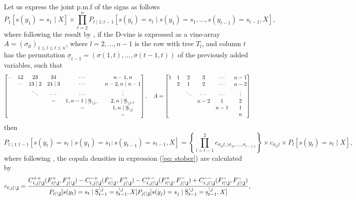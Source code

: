 \documentclass[harvard,11pt]{article}
\begin{document}
Let us express the joint p.m.f of the signs as follows
\begin{equation}
P_1[s(y_1)=s_1\mid X]\times\prod\limits_{t=2}^{n}P_{t\mid 1:{t-1}}[s(y_t)=s_t\mid s(y_1)=s_1,...,s(y_{t-1})=s_{t-1},X],
\end{equation}
where following the result by \citet{stoeber2013simplified}, if the D-vine is expressed as a vine-array $A=(\sigma_{lt})_{1\leq l\leq t\leq n}$, where $l=2,...,n-1$ is the row with tree $T_l$, and column $t$ has the permutation $\underline{\sigma}_{t-1}=(\sigma(1,t),...,\sigma(t-1,t))$ of the previously added variables, such that
\begin{equation*}
\begin{bmatrix}
- & 12 & 23 &34 &\cdots & n-1,n\\
 &-&13\mid2&24\mid 3&\cdots&n-2,n\mid n-1\\
& & \ddots&\cdots&\cdots&\vdots\\
&&&-&1,n-1\mid \text{\b{S}}_{\backslash j-}&2,n \mid \text{\b{S}}_{\backslash j+}\\
&&&&-&1,n\mid \text{\b{S}}_{\backslash j}\\
&&&&&-
\end{bmatrix},\quad
A=
\begin{bmatrix}
1 & 1 & 2 &3 &\cdots & n-1\\
 &2&1&2&\cdots&n-2\\
& & \ddots&\cdots&\cdots&\vdots\\
&&&n-2&1&2\\
&&&&n-1&1\\
&&&&&n
\end{bmatrix}
\end{equation*}
then 
\begin{equation}\label{eq: stober}
P_{t\mid 1:{t-1}}[s(y_t)=s_t\mid s(y_1)=s_1:s(y_{t-1})=s_{t-1}, X]=\left\{\prod\limits_{l=t-1}^{2} c_{\sigma_{lt}t,\mid \sigma_{1t},...,\sigma_{t-1,t}}\right\}\times c_{\sigma_{lt}t}\times P_t[s(y_t)=s_t\mid X],
\end{equation}
where following \citet{joe2014dependence}, the copula densities in expression (\ref{eq: stober}) are calculated by
\begin{equation}
c_{t,j\mid \mathbf{\backslash j}}=\frac{C_{t,j\mid \mathbf{\backslash j}}^{++}(F_{t\mid \mathbf{\backslash j}}^+,F_{j\mid \mathbf{\backslash j}}^+)-C_{t,j\mid \mathbf{\backslash j}}^{-+}(F_{t\mid \mathbf{\backslash j}}^-,F_{j\mid \mathbf{\backslash j}}^+)-C_{t,j\mid \mathbf{\backslash j}}^{+-}(F_{t\mid \mathbf{\backslash j}}^+,F_{j\mid \mathbf{\backslash j}}^-)+C_{t,j\mid \mathbf{\backslash j}}^{--}(F_{t\mid \mathbf{\backslash j}}^-,F_{j\mid \mathbf{\backslash j}}^-)}{P_{t\mid \mathbf{\backslash j}}[s(y_t)=s_t\mid\text{\b{S}}_{t-1}^{\backslash j}=\text{\b{s}}_{t-1}^{\backslash j},X]P_{j\mid \mathbf{\backslash j}}[s(y_j)=s_j\mid\text{\b{S}}_{t-1}^{\backslash j}=\text{\b{s}}_{t-1}^{\backslash j},X]},
\end{equation}
\end{document}
